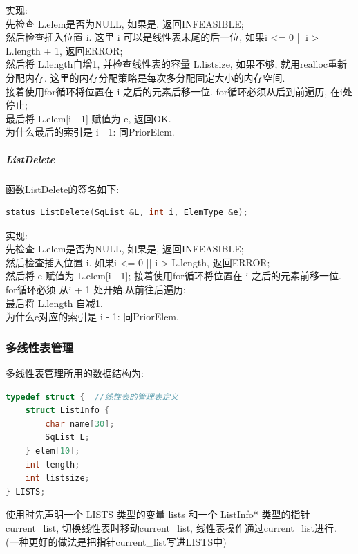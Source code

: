 \documentclass[supercite]{Experimental_Report}
\theoremstyle{definition}
\begin{document}
\noindent
实现: \\
先检查 L.elem是否为NULL, 如果是, 返回INFEASIBLE; \\
然后检查插入位置 i. 这里 i 可以是线性表末尾的后一位, 如果i <= 0 || i > L.length + 1, 返回ERROR; \\
然后将 L.length自增1, 并检查线性表的容量 L.listsize, 如果不够, 就用realloc重新分配内存. 这里的内存分配策略是每次多分配固定大小的内存空间. \\
接着使用for循环将位置在 i 之后的元素后移一位. for循环必须从后到前遍历, 在i处停止; \\
最后将 L.elem[i - 1] 赋值为 e, 返回OK. \\
为什么最后的索引是 i - 1: 同PriorElem.\\

\subparagraph{ListDelete}
\noindent
函数ListDelete的签名如下:
\begin{lstlisting}[language=C++, frame=single]
status ListDelete(SqList &L, int i, ElemType &e);
\end{lstlisting}

\noindent
实现: \\
先检查 L.elem是否为NULL, 如果是, 返回INFEASIBLE; \\
然后检查插入位置 i. 如果i <= 0 || i > L.length, 返回ERROR; \\
然后将 e 赋值为 L.elem[i - 1];
接着使用for循环将位置在 i 之后的元素前移一位. for循环必须 从i + 1 处开始,从前往后遍历; \\
最后将 L.length 自减1. \\
为什么e对应的索引是 i - 1: 同PriorElem.\\

\newpage

\subsubsection{多线性表管理}
\noindent
多线性表管理所用的数据结构为:
\begin{lstlisting}[language=C++, frame=single]
typedef struct {  //线性表的管理表定义
    struct ListInfo {
        char name[30];
        SqList L;
    } elem[10];
    int length;
    int listsize;
} LISTS;
\end{lstlisting}
使用时先声明一个 LISTS 类型的变量 lists 和一个 ListInfo* 类型的指针 current\_list, 切换线性表时移动current\_list, 线性表操作通过current\_list进行.\\
(一种更好的做法是把指针current\_list写进LISTS中) \\
\end{document}
